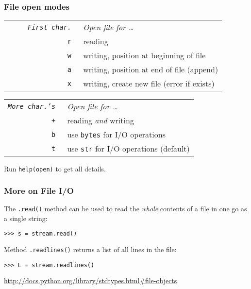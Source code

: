 \documentclass[english,serif,mathserif,xcolor=pdftex,dvipsnames,table]{beamer}
\begin{document}
\begin{frame}
  \frametitle{File open modes}
  \begin{center}
    \begin{tabular}{>{\tt}rl}
      {\rm\em ~~~~~First char.}
      & {\rm\em Open file for \ldots}
      \\
      \texttt{r}
      & reading
      \\
      \texttt{w}
      & writing, position at beginning of file
      \\
      \texttt{a}
      & writing, position at end of file (append)
      \\
      \texttt{x}
      & writing, create new file (error if exists)
      \\
    \end{tabular}

    \+
    \begin{tabular}{>{\tt}rl}
      {\rm\em More char.'s}
      & {\rm\em Open file for \ldots}
      \\
      \texttt{+}
      & reading \emph{and} writing
      \\
      \texttt{b}
      & use \texttt{bytes} for I/O operations
      \\
      \texttt{t}
      & use \texttt{str} for I/O operations (default)
      \\
    \end{tabular}

    \+ Run \texttt{help(open)} to get all details.
  \end{center}
\end{frame}

\begin{frame}[fragile]
  \frametitle{More on File I/O}

  The \lstinline|.read()| method can be used to read the \emph{whole} contents
  of a file in one go as a single string:
\begin{lstlisting}
>>> s = stream.read()
\end{lstlisting}

  \+
  Method \lstinline|.readlines()| returns a list of all lines in the file:
\begin{lstlisting}
>>> L = stream.readlines()
\end{lstlisting}

  \begin{references}
    \url{http://docs.python.org/library/stdtypes.html#file-objects}
  \end{references}
\end{frame}
\end{document}

